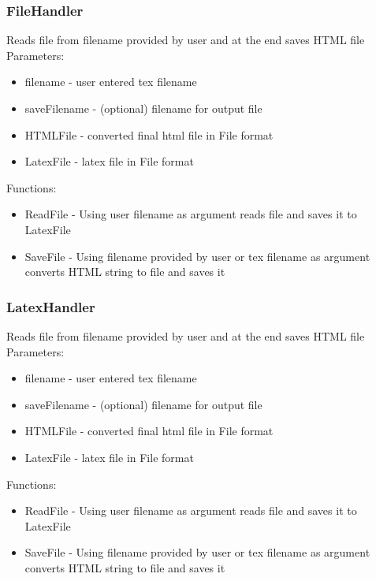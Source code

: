 \documentclass[12pt]{article}
\begin{document}
\subsubsection{FileHandler}
Reads file from filename provided by user and at the end saves HTML file \\ 
Parameters: \\ 
\begin{itemize}
\item filename - user entered tex filename
\item saveFilename - (optional) filename for output file 
\item HTMLFile - converted final html file in File format 
\item LatexFile - latex file in File format 
\end{itemize}
Functions: 
\begin{itemize}
    \item ReadFile - Using user filename as argument reads file and saves it to LatexFile
    \item SaveFile - Using filename provided by user or tex filename as argument converts HTML string to file and saves it 
\end{itemize}

\subsubsection{LatexHandler}
Reads file from filename provided by user and at the end saves HTML file \\ 
Parameters: \\ 
\begin{itemize}
\item filename - user entered tex filename
\item saveFilename - (optional) filename for output file 
\item HTMLFile - converted final html file in File format 
\item LatexFile - latex file in File format 
\end{itemize}
Functions: 
\begin{itemize}
    \item ReadFile - Using user filename as argument reads file and saves it to LatexFile
    \item SaveFile - Using filename provided by user or tex filename as argument converts HTML string to file and saves it 
\end{itemize}
\end{document}
